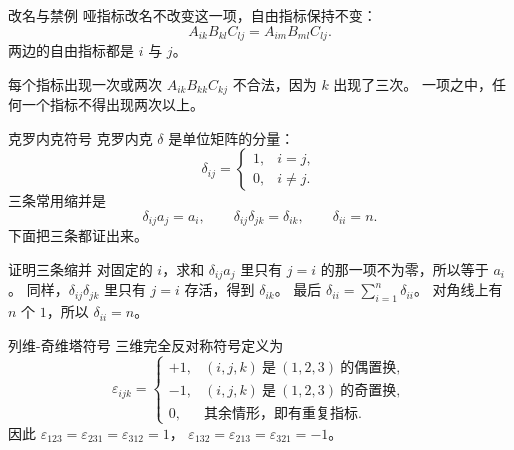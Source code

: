\documentclass[fontset=windows, chinese, 10pt, xcolor=dvipsnames]{beamer}
\begin{document}
\begin{frame}{改名与禁例}
  哑指标改名不改变这一项，自由指标保持不变：
  \begin{equation*}
    A_{ik}B_{kl}C_{lj}
    =A_{im}B_{ml}C_{lj}.
  \end{equation*}
  两边的自由指标都是 $i$ 与 $j$。
  \vspace{0.5em}
  \begin{alertblock}{每个指标出现一次或两次}
    $A_{ik}B_{kk}C_{kj}$ 不合法，因为 $k$ 出现了三次。
    一项之中，任何一个指标不得出现两次以上。
  \end{alertblock}
\end{frame}

\begin{frame}{克罗内克符号}
  克罗内克 $\delta$ 是单位矩阵的分量：
  \begin{equation*}
    \delta_{ij}
    =
    \begin{cases}
      1, & i=j,\\
      0, & i\neq j.
    \end{cases}
  \end{equation*}
  三条常用缩并是
  \begin{equation*}
    \delta_{ij}a_j=a_i,
    \qquad
    \delta_{ij}\delta_{jk}=\delta_{ik},
    \qquad
    \delta_{ii}=n.
  \end{equation*}
  下面把三条都证出来。
\end{frame}

\begin{frame}{证明三条缩并}
  对固定的 $i$，求和 $\delta_{ij}a_j$ 里只有 $j=i$ 的那一项不为零，所以等于 $a_i$。
  \vspace{0.4em}
  同样，$\delta_{ij}\delta_{jk}$ 里只有 $j=i$ 存活，得到 $\delta_{ik}$。
  \vspace{0.4em}
  最后 $\delta_{ii}=\sum_{i=1}^{n}\delta_{ii}$。
  对角线上有 $n$ 个 $1$，所以 $\delta_{ii}=n$。
\end{frame}

\begin{frame}{列维-奇维塔符号}
  三维完全反对称符号定义为
  \begin{equation*}
    \varepsilon_{ijk}
    =
    \begin{cases}
      +1, & (i,j,k)\ \text{是}\ (1,2,3)\ \text{的偶置换},\\
      -1, & (i,j,k)\ \text{是}\ (1,2,3)\ \text{的奇置换},\\
      0, & \text{其余情形，即有重复指标}.
    \end{cases}
  \end{equation*}
  因此
  $\varepsilon_{123}=\varepsilon_{231}=\varepsilon_{312}=1$，
  $\varepsilon_{132}=\varepsilon_{213}=\varepsilon_{321}=-1$。
\end{frame}
\end{document}
